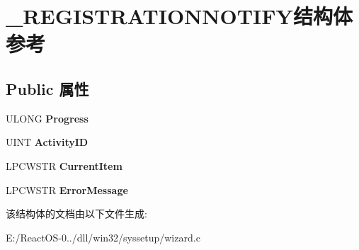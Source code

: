 \hypertarget{struct___r_e_g_i_s_t_r_a_t_i_o_n_n_o_t_i_f_y}{}\section{\+\_\+\+R\+E\+G\+I\+S\+T\+R\+A\+T\+I\+O\+N\+N\+O\+T\+I\+F\+Y结构体 参考}
\label{struct___r_e_g_i_s_t_r_a_t_i_o_n_n_o_t_i_f_y}
\subsection*{Public 属性}
\begin{DoxyCompactItemize}
\item 
\mbox{\label{struct___r_e_g_i_s_t_r_a_t_i_o_n_n_o_t_i_f_y_a5a521e86422c0326720e71913c3e8db2}} 
U\+L\+O\+NG {\bfseries Progress}
\item 
\mbox{\label{struct___r_e_g_i_s_t_r_a_t_i_o_n_n_o_t_i_f_y_afda902fbaa263d6991ebc68491273cb3}} 
U\+I\+NT {\bfseries Activity\+ID}
\item 
\mbox{\label{struct___r_e_g_i_s_t_r_a_t_i_o_n_n_o_t_i_f_y_ab289888089e29d64ad1f2c923aca1350}} 
L\+P\+C\+W\+S\+TR {\bfseries Current\+Item}
\item 
\mbox{\label{struct___r_e_g_i_s_t_r_a_t_i_o_n_n_o_t_i_f_y_a124424bfd2e4892e7c3eb84e474058ae}} 
L\+P\+C\+W\+S\+TR {\bfseries Error\+Message}
\end{DoxyCompactItemize}


该结构体的文档由以下文件生成\+:\begin{DoxyCompactItemize}
\item 
E\+:/\+React\+O\+S-\/0../dll/win32/syssetup/wizard.\+c\end{DoxyCompactItemize}
